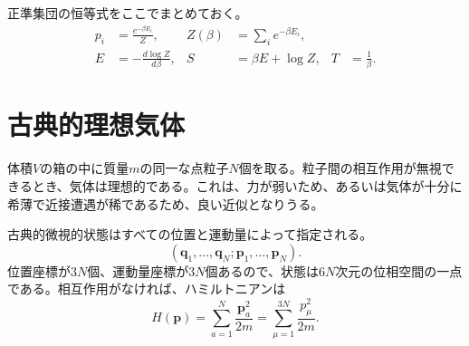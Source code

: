 \begin{classroomqa}
\end{classroomqa}

正準集団の恒等式をここでまとめておく。
\begin{align}
 p_i&=\frac{e^{-\beta E_i}}{Z},&
 Z(\beta)&=\sum_i e^{-\beta E_i},\label{eq:sm4-canonical-pair}\\
 E&=-\frac{d\log Z}{d\beta},&
 S&=\beta E+\log Z,&
 T&=\frac{1}{\beta}.
 \label{eq:sm4-canonical-identities}
\end{align}

\section{古典的理想気体}

体積\(V\)の箱の中に質量\(m\)の同一な点粒子\(N\)個を取る。粒子間の相互作用が無視できるとき、気体は理想的である。これは、力が弱いため、あるいは気体が十分に希薄で近接遭遇が稀であるため、良い近似となりうる。

古典的微視的状態はすべての位置と運動量によって指定される。
\begin{equation}
 (\bm q_1,\ldots,\bm q_N;\bm p_1,\ldots,\bm p_N).
\end{equation}
位置座標が\(3N\)個、運動量座標が\(3N\)個あるので、状態は\(6N\)次元の位相空間の一点である。相互作用がなければ、ハミルトニアンは
\begin{equation}
 H(\bm p)=\sum_{a=1}^{N}\frac{\bm p_a^2}{2m}
 =\sum_{\mu=1}^{3N}\frac{p_\mu^2}{2m}.
 \label{eq:sm4-ideal-hamiltonian}
\end{equation}

\begin{classroomqa}
\end{classroomqa}

